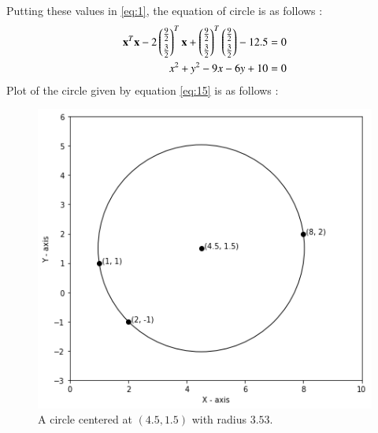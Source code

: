 \documentclass[journal,12pt,twocolumn]{IEEEtran}
\begin{document}
Putting these values in \eqref{eq:1}, the equation of circle is as follows : 
\begin{align}
\mathbf{x}^T\mathbf{x}-2\begin{pmatrix}\frac{9}{2}\\[0.1cm]\frac{3}{2}\end{pmatrix}^T\mathbf{x}+\begin{pmatrix}\frac{9}{2}\\[0.1cm]\frac{3}{2}\end{pmatrix}^T\begin{pmatrix}\frac{9}{2}\\[0.1cm]\frac{3}{2}\end{pmatrix}-12.5&=0\label{eq:14}\\
x^2+y^2-9x-6y+10&=0\label{eq:15}
\end{align}
Plot of the circle given by equation \eqref{eq:15} is as follows :
\begin{figure}[h]
\centering
    \includegraphics[width=\columnwidth]{circle2.png}
    \caption{A circle centered at $(4.5, 1.5)$ with radius $3.53$.}
    \label{circle}
\end{figure}
\end{document}
